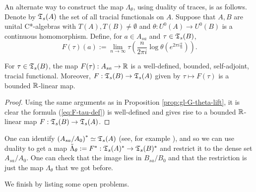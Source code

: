 \documentclass[12pt]{amsart}
\begin{document}
An alternate way to construct the map $\Lambda_\theta$, using duality of traces, is as follows. Denote by $\mathfrak{T}_s(A)$ the set of all tracial functionals on $A$. Suppose that $A,B$ are unital C*-algebras with $T(A),T(B) \neq \emptyset$ and $\theta: U^0(A) \to U^0(B)$ is a continuous homomorphism. Define, for $a \in A_{sa}$ and $\tau \in \mathfrak{T}_s(B)$,
\begin{equation}\label{eq:F-tau-def}
F(\tau)(a) := \lim_{n \to \infty} \tau\left(\frac{n}{2\pi i}\log \theta(e^{2\pi i \frac{a}{n}})\right).
\end{equation}

\begin{prop}
For $\tau \in \mathfrak{T}_s(B)$, the map $F(\tau): A_{sa} \to \mathbb{R}$ is a well-defined, bounded, self-adjoint, tracial functional. Moreover, $F: \mathfrak{T}_s(B) \to \mathfrak{T}_s(A)$ given by $\tau \mapsto F(\tau)$ is a bounded $\mathbb{R}$-linear map. 
\end{prop}
\begin{proof}
Using the same arguments as in Proposition \ref{prop:gl-G-theta-lift}, it is clear the formula (\ref{eq:F-tau-def}) is well-defined and gives rise to a bounded $\mathbb{R}$-linear map $F: \mathfrak{T}_s(B) \to \mathfrak{T}_s(A)$. 
\end{proof}

One can identify $\left(A_{sa}/A_0\right)^* \simeq \mathfrak{T}_s(A)$ (see, for example \cite{CuntzPedersen79}), and so we can use duality to get a map $\tilde{\Lambda}_\theta:= F^*: \mathfrak{T}_s(A)^* \to \mathfrak{T}_s(B)^*$ and restrict it to the dense set $A_{sa}/A_0$. One can check that the image lies in $B_{sa}/B_0$ and that the restriction is just the map $\Lambda_\theta$ that we got before. 

We finish by listing some open problems.
\end{document}
